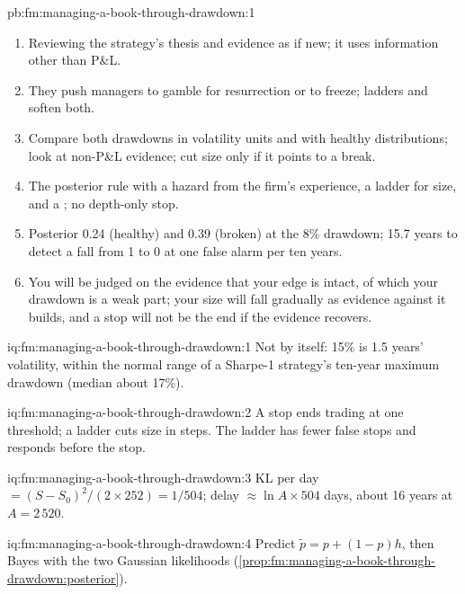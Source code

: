 \begin{solution}{pb:fm:managing-a-book-through-drawdown:1}
\begin{enumerate}
\item Reviewing the strategy's thesis and evidence as if new; it uses information other than P\&L.
\item They push managers to gamble for resurrection or to freeze; ladders and  soften both.
\item Compare both drawdowns in volatility units and with healthy distributions; look at non-P\&L evidence; cut size only if it points to a
break.
\item The posterior rule with a hazard from the firm's experience, a ladder for size, and a ; no depth-only stop.
\item Posterior 0.24 (healthy) and 0.39 (broken) at the 8\% drawdown; 15.7 years to detect a fall from 1 to 0 at one false alarm per ten years.
\item You will be judged on the evidence that your edge is intact, of which your drawdown is a weak part; your size will fall gradually as
evidence against it builds, and a stop will not be the end if the evidence recovers.
\end{enumerate}
\end{solution}

\begin{solution}{iq:fm:managing-a-book-through-drawdown:1}
Not by itself: 15\% is 1.5 years' volatility, within the normal range of a Sharpe-1 strategy's ten-year maximum drawdown (median about 17\%).
\end{solution}

\begin{solution}{iq:fm:managing-a-book-through-drawdown:2}
A stop ends trading at one threshold; a ladder cuts size in steps. The ladder has fewer false stops and responds before the stop.
\end{solution}

\begin{solution}{iq:fm:managing-a-book-through-drawdown:3}
KL per day $=(S-S_0)^2/(2\times252)=1/504$; delay $\approx\ln A\times504$ days, about 16 years at $A=2\,520$.
\end{solution}

\begin{solution}{iq:fm:managing-a-book-through-drawdown:4}
Predict $\tilde p=p+(1-p)h$, then Bayes with the two Gaussian likelihoods (\cref{prop:fm:managing-a-book-through-drawdown:posterior}).
\end{solution}

